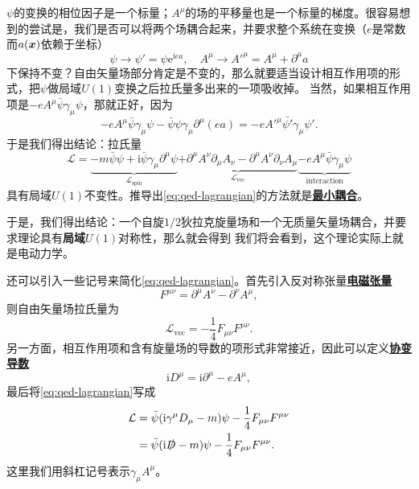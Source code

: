 \documentclass[UTF8, a4paper]{ctexart}
\newcommand*{\ee}{\mathrm{e}}
\newcommand*{\ii}{\mathrm{i}}
\renewcommand{\emph}[1]{\textbf{#1}}
\newcommand*{\concept}[1]{\underline{\textbf{#1}}}
\begin{document}
$\psi$的变换的相位因子是一个标量；$A^\mu$的场的平移量也是一个标量的梯度。很容易想到的尝试是，我们是否可以将两个场耦合起来，并要求整个系统在变换（$e$是常数而$a(\vb*{x})$依赖于坐标）
\begin{equation}
    \psi \longrightarrow \psi' = \psi \ee^{\ii e a}, \quad A^\mu \longrightarrow A'^\mu = A^\mu + \partial^\mu a
    \label{eq:gauge-transformation}
\end{equation}
下保持不变？自由矢量场部分肯定是不变的，那么就要适当设计相互作用项的形式，把$\psi$做局域$U(1)$变换之后拉氏量多出来的一项吸收掉。
当然，如果相互作用项是$- e A^\mu \bar{\psi} \gamma_\mu \psi$，那就正好，因为
\[
    - e A^\mu \bar{\psi} \gamma_\mu \psi - \bar{\psi} \psi \gamma_\mu \partial^\mu (e a) = - e A'^\mu \bar{\psi'} \gamma_\mu \psi'.
\]
于是我们得出结论：拉氏量
\begin{equation}
    \mathcal{L} = 
    \underbrace{- m \bar{\psi} \psi + \ii \bar{\psi} \gamma_\mu \partial^\mu \psi }_{\mathcal{L}_\text{spin}}
    \underbrace{+ \partial^\mu A^\nu \partial_\mu A_\nu - \partial^\mu A^\nu \partial_\nu A_\mu}_{\mathcal{L}_\text{vec}}
    \underbrace{- e A^\mu \bar{\psi} \gamma_\mu \psi}_\text{interaction}
    \label{eq:qed-lagrangian}
\end{equation}
具有局域$U(1)$不变性。推导出\eqref{eq:qed-lagrangian}的方法就是\concept{最小耦合}。

于是，我们得出结论：一个自旋$1/2$狄拉克旋量场和一个无质量矢量场耦合，并要求理论具有\emph{局域}$U(1)$对称性，那么就会得到
我们将会看到，这个理论实际上就是电动力学。

还可以引入一些记号来简化\eqref{eq:qed-lagrangian}。首先引入反对称张量\concept{电磁张量}
\begin{equation}
    F^{\mu \nu} = \partial^\mu A^\nu - \partial^\nu A^\mu,
\end{equation}
则自由矢量场拉氏量为
\[
    \mathcal{L}_\text{vec} = - \frac{1}{4} F_{\mu \nu} F^{\mu \nu}.
\]
另一方面，相互作用项和含有旋量场的导数的项形式非常接近，因此可以定义\concept{协变导数}
\begin{equation}
    \ii D^\mu = \ii \partial^\mu - e A^\mu,
\end{equation}
最后将\eqref{eq:qed-lagrangian}写成
\begin{equation}
    \begin{aligned}
        \mathcal{L} &= \bar{\psi} (\ii \gamma^\mu D_\mu - m) \psi - \frac{1}{4} F_{\mu \nu} F^{\mu \nu} \\
        &= \bar{\psi} (\ii \slashed{D} - m) \psi - \frac{1}{4} F_{\mu \nu} F^{\mu \nu}. 
    \end{aligned}
\end{equation}
这里我们用斜杠记号表示$\gamma_\mu A^\mu$。
\end{document}
